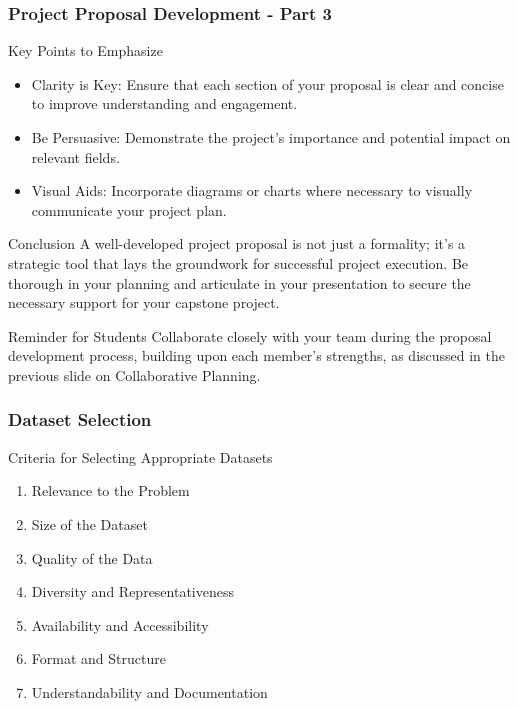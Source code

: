\documentclass[aspectratio=169]{beamer}
\begin{document}
\begin{frame}[fragile]
    \frametitle{Project Proposal Development - Part 3}
    \begin{block}{Key Points to Emphasize}
        \begin{itemize}
            \item Clarity is Key: Ensure that each section of your proposal is clear and concise to improve understanding and engagement.
            \item Be Persuasive: Demonstrate the project's importance and potential impact on relevant fields.
            \item Visual Aids: Incorporate diagrams or charts where necessary to visually communicate your project plan.
        \end{itemize}
    \end{block}
    
    \begin{block}{Conclusion}
        A well-developed project proposal is not just a formality; it’s a strategic tool that lays the groundwork for successful project execution. Be thorough in your planning and articulate in your presentation to secure the necessary support for your capstone project.
    \end{block}
    
    \begin{block}{Reminder for Students}
        Collaborate closely with your team during the proposal development process, building upon each member's strengths, as discussed in the previous slide on Collaborative Planning.
    \end{block}
\end{frame}

\begin{frame}[fragile]
    \frametitle{Dataset Selection}
    \begin{block}{Criteria for Selecting Appropriate Datasets}
        \begin{enumerate}
            \item Relevance to the Problem
            \item Size of the Dataset
            \item Quality of the Data
            \item Diversity and Representativeness
            \item Availability and Accessibility
            \item Format and Structure
            \item Understandability and Documentation
        \end{enumerate}
    \end{block}
\end{frame}
\end{document}
